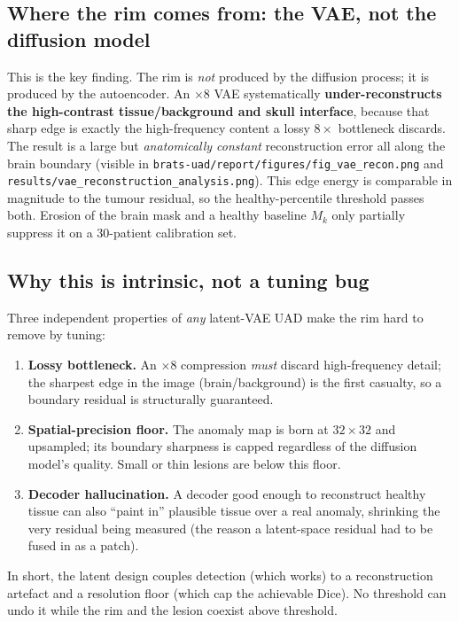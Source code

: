 \documentclass[11pt,a4paper]{article}
\newcommand{\code}[1]{\texttt{\small #1}}
\begin{document}
\subsection{Where the rim comes from: the VAE, not the diffusion model}
This is the key finding. The rim is \emph{not} produced by the diffusion process;
it is produced by the autoencoder. An $\times8$ VAE systematically
\textbf{under-reconstructs the high-contrast tissue/background and skull
interface}, because that sharp edge is exactly the high-frequency content a
lossy $8\times$ bottleneck discards. The result is a large but
\emph{anatomically constant} reconstruction error all along the brain boundary
(visible in \code{brats-uad/report/figures/fig\_vae\_recon.png} and
\code{results/vae\_reconstruction\_analysis.png}). This edge energy is comparable
in magnitude to the tumour residual, so the healthy-percentile threshold passes
both. Erosion of the brain mask and a healthy baseline $M_k$ only partially
suppress it on a 30-patient calibration set.

\subsection{Why this is intrinsic, not a tuning bug}
Three independent properties of \emph{any} latent-VAE UAD make the rim hard to
remove by tuning:
\begin{enumerate}[leftmargin=1.5em,itemsep=1pt]
\item \textbf{Lossy bottleneck.} An $\times8$ compression \emph{must} discard
high-frequency detail; the sharpest edge in the image (brain/background) is the
first casualty, so a boundary residual is structurally guaranteed.
\item \textbf{Spatial-precision floor.} The anomaly map is born at $32\times32$
and upsampled; its boundary sharpness is capped regardless of the diffusion
model's quality. Small or thin lesions are below this floor.
\item \textbf{Decoder hallucination.} A decoder good enough to reconstruct
healthy tissue can also ``paint in'' plausible tissue over a real anomaly,
shrinking the very residual being measured (the reason a latent-space residual had to
be fused in as a patch).
\end{enumerate}
In short, the latent design couples detection (which works) to a reconstruction
artefact and a resolution floor (which cap the achievable Dice). No threshold can
undo it while the rim and the lesion coexist above threshold.
\end{document}
